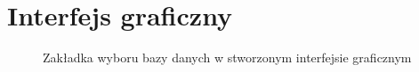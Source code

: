 \chapter{Interfejs graficzny}
\label{chapter:gui}

\begin{figure}[ht!]
  \centering
  \caption{Zakładka wyboru bazy danych w stworzonym interfejsie graficznym}
  \label{fig:gui-selection-tab}
\end{figure}

